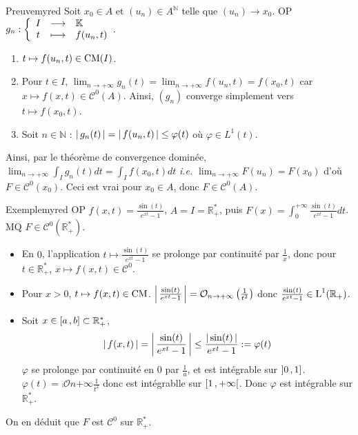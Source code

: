    \begin{demo}{Preuve}{myred}
        Soit $x_0 \in A$ et $(u_n) \in A^{\mathbb{N}}$ telle que $(u_n) \to x_0$. OP $\fonction{g_n}{I}{\mathbb{K}}{t}{f(u_n,t)}$.
        \begin{enumerate}
            \item $t \mapsto f(u_n,t) \in \operatorname{CM}(I)$.
            \item Pour $t \in I$, $\lim_{n \to +\infty} g_n(t) = \lim_{n \to +\infty} f(u_n,t) = f(x_0,t)$ car $x \mapsto f(x,t) \in \mathcal{C}^0(A)$. Ainsi, $(g_n)$ converge simplement vers $t \mapsto f(x_0,t)$.
            \item Soit $n \in \mathbb{N}$ : $\left\lvert \,g_n(t) \, \right\rvert = \left\lvert \,f(u_n,t) \, \right\rvert \leq \varphi(t)$ où $\varphi \in L^1(t)$. 
        \end{enumerate}
        Ainsi, par le théorème de convergence dominée, $\lim_{n \to +\infty} \int_{I} g_n(t) dt = \int_{I} f(x_0,t) dt$ \textit{i.e.} $\lim_{n \to + \infty} F(u_n) = F(x_0)$ d’où $F \in \mathcal{C}^0(x_0)$. Ceci est vrai pour $x_0 \in A$, donc $F \in \mathcal{C}^0(A)$.
    \end{demo} 

    \begin{omed}{Exemple}{myred}
        OP $f(x,t) = \frac{\sin(t)}{e^{xt} - 1}$, $A = I = \mathbb{R}_+^*$, puis $F(x) = \int_{0}^{+\infty} \frac{\sin(t)}{e^{xt} - 1} dt$. MQ $F \in \mathcal{C}^0(\mathbb{R}_+^*)$.
        \begin{itemize}
            \item En $0$, l’application $t \mapsto \frac{\sin(t)}{e^{xt} - 1}$ se prolonge par continuité par $\frac{1}{x}$, donc pour $t \in \mathbb{R}_+^*$, $x \mapsto f(x,t) \in \mathcal{C}^0$.
            \item Pour $x > 0$, $t \mapsto f(x,t) \in \operatorname{CM}$. $\left\lvert \,\frac{\sin(t)}{e^{xt} - 1} \, \right\rvert = \mathcal{O}_{n \rightarrow +\infty} \left(\frac{1}{t^2}\right)$ donc $\frac{\sin(t)}{e^{xt} - 1} \in \operatorname{L}^1(\mathbb{R}_+)$. 
            \item Soit $x \in \left[ a \, , b \right] \subset \mathbb{R}_+^*$,
            \[ \left\lvert \,f(x,t) \, \right\rvert = \left\lvert \,\frac{\sin(t)}{e^{xt} - 1} \, \right\rvert \leq \frac{\left\lvert \,\sin(t) \, \right\rvert}{e^{xt}- 1} := \varphi(t)  \]
            $\varphi$ se prolonge par continuité en $0$ par $\frac{1}{a}$, et est intégrable sur $\left] 0 \, , 1 \right]$. $\varphi(t) = \comp{\mathcal{O}}{n}{+\infty}{\frac{1}{t^2}}$ donc est intégrablle sur $\left[ 1 \, , +\infty \right[$. Donc $\varphi$ est intégrable sur $\mathbb{R}^*_+$.
        \end{itemize}
        On en déduit que $F$ est $\mathcal{C}^0$ sur $\mathbb{R}_+^*$.
    \end{omed}

